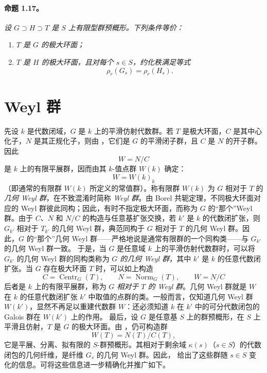 \paragraph{\textbf{命题 1.17。}}
\emph{设 \(G\supset H\supset T\) 是 \(S\) 上有限型群预概形。下列条件等价：}
\begin{enumerate}
\renewcommand{\labelenumi}{(\roman{enumi})}
\item \emph{\(T\) 是 \(G\) 的极大环面；}
\item \emph{\(T\) 是 \(H\) 的极大环面，且对每个 \(s\in S\)，约化秩满足等式
\[
    \rho_r(G_s)=\rho_r(H_s).
  \]
}
\end{enumerate}
\section{Weyl 群}
先设 \(k\) 是代数闭域，\(G\) 是 \(k\) 上的平滑仿射代数群。若 \(T\) 是极大环面，\(C\) 是其中心化子，\(N\) 是其正规化子，则由 ，它们是 \(G\) 的平滑闭子群，且 \(C\) 是 \(N\) 的开子群。因此
\[
  W=N/C
\]
是 \(k\) 上的有限平展群，因而由其 \(k\)-值点群 \(W(k)\) 确定：
\[
  W=W(k)_k
\]
（即通常的有限群 \(W(k)\) 所定义的常值群）。称有限群 \(W(k)\) 为 \(G\) 相对于 \(T\) 的\emph{几何 Weyl 群}，在不致混淆时简称 \emph{Weyl 群}。由 Borel 共轭定理，不同极大环面对应的 Weyl 群彼此同构；因此，有时不指定极大环面，而称为 \(G\) 的“那个”Weyl 群。由于 \(C\)、\(N\) 和 \(N/C\) 的构造与任意基扩张交换，若 \(k'\) 是 \(k\) 的代数闭扩张，则 \(G_{k'}\) 相对于 \(T_{k'}\) 的几何 Weyl 群，典范同构于 \(G\) 相对于 \(T\) 的几何 Weyl 群。因此，\(G\) 的“那个”几何 Weyl 群——严格地说是通常有限群的一个同构类——与 \(G_{k'}\) 的几何 Weyl 群一致。
于是，当 \(G\) 是任意域 \(k\) 上的平滑仿射代数群时，可以将 \(G_{k'}\) 的几何 Weyl 群的同构类称为 \emph{\(G\) 的几何 Weyl 群}，其中 \(k'\) 是 \(k\) 的任意代数闭扩张。当 \(G\) 存在极大环面 \(T\) 时，可以如上构造
\[
  C=\operatorname{Centr}_G(T),\qquad
  N=\operatorname{Norm}_G(T),\qquad
  W=N/C
\]
后者是 \(k\) 上的有限平展群，称为 \emph{\(G\) 相对于 \(T\) 的 Weyl 群}。几何 Weyl 群就是 \(W\) 在 \(k\) 的任意代数闭扩张 \(k'\) 中取值的点群的类。一般而言，仅知道几何 Weyl 群 \(W(k')\)，显然不再足以重建代数群 \(W\)：还必须知道 \(k\) 在 \(k'\) 中的可分代数闭包的 Galois 群在 \(W(k')\) 上的作用。
最后，设 \(G\) 是任意基 \(S\) 上的群预概形，在 \(S\) 上平滑且仿射，\(T\) 是 \(G\) 的极大环面。由 ，仍可构造群
\[
  W(T)=N(T)/C(T),
\]
它是平展、分离、拟有限的 \(S\)-群预概形。其相对于剩余域 \(\kappa(s)\)（\(s\in S\)）的代数闭包的几何纤维，是纤维 \(G_s\) 的几何 Weyl 群。因此， 给出了这些群随 \(s\in S\) 变化的信息。可将这些信息进一步精确化并推广如下。
